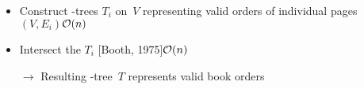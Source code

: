 \begin{frame}
\begin{overprint}
\begin{itemize}
\end{itemize}

\begin{itemize}
\item Construct \PQ-trees $T_i$ on~$V$ representing valid orders of individual pages
$(V,E_i)$\hfill$\mathcal{O}(n)$
\item Intersect the $T_i$ [Booth, 1975]\hfill$\mathcal{O}(n)$
\item[$\rightarrow$] Resulting \PQ-tree~$T$ represents valid book orders
\end{itemize}
\end{overprint}

\end{frame} 

